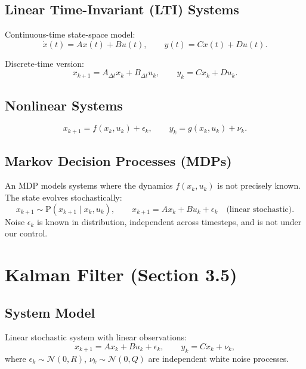 \documentclass[12pt, a4paper]{article}
\begin{document}
\subsection{Linear Time-Invariant (LTI) Systems}

Continuous-time state-space model:
\begin{equation}
  \dot{x}(t) = Ax(t) + Bu(t), \qquad y(t) = Cx(t) + Du(t).
  \label{eq:LTI_ct}
\end{equation}

Discrete-time version:
\begin{equation}
  x_{k+1} = A_{\Delta t} x_k + B_{\Delta t} u_k, \qquad y_k = Cx_k + Du_k.
  \label{eq:LTI_dt}
\end{equation}

\subsection{Nonlinear Systems}

\begin{equation}
  x_{k+1} = f(x_k,u_k) + \epsilon_k, \qquad y_k = g(x_k,u_k) + \nu_k.
  \label{eq:nonlinear}
\end{equation}

\subsection{Markov Decision Processes (MDPs)}

An MDP models systems where the dynamics $f(x_k,u_k)$ is not precisely
known. The state evolves stochastically:
\begin{equation}
  x_{k+1} \sim \mathrm{P}(x_{k+1}\mid x_k, u_k), \qquad
  x_{k+1} = Ax_k + Bu_k + \epsilon_k \quad\text{(linear stochastic)}.
\end{equation}
Noise $\epsilon_k$ is known in distribution, independent across timesteps,
and is not under our control.

\section{Kalman Filter (Section 3.5)}

\subsection{System Model}

Linear stochastic system with linear observations:
\begin{equation}
  x_{k+1} = Ax_k + Bu_k + \epsilon_k, \qquad
  y_k = Cx_k + \nu_k,
  \label{eq:KF_model}
\end{equation}
where $\epsilon_k\sim\mathcal{N}(0,R)$, $\nu_k\sim\mathcal{N}(0,Q)$ are
independent white noise processes.
\end{document}
